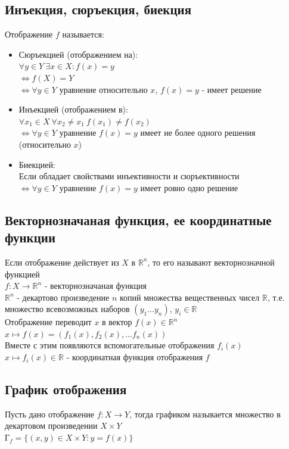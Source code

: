 \newpage
\subsection{Инъекция, сюръекция, биекция}
Отображение $f$ называется:
\begin{itemize}
\item Сюръекцией (отображением на):\\
$\forall y \in Y \ \exists x \in X: f(x) = y$\\
$\Leftrightarrow f(X) = Y$\\
$\Leftrightarrow \forall y \in Y$ уравнение относительно $x$, $f(x) = y$ - имеет решение
\item Инъекцией (отображением в):\\%
$\forall x_1 \in X \ \forall x_2 \neq x_1 \ f(x_1) \neq f(x_2)$\\
$\Leftrightarrow \forall y \in Y$ уравнение $f(x) = y$ имеет не более одного решения (относительно $x$)
\item Биекцией:\\
Если обладает свойствами инъективности и сюръективности\\
$\Leftrightarrow \forall y \in Y$ уравнение $f(x) = y$ имеет ровно одно решение
\end{itemize}
\newpage
\subsection{Векторнозначаная функция, ее координатные функции}
Если отображение действует из $X$ в $\mathbb{R}^n$, то его называют векторнозначной функцией\\
$f: X \rightarrow \mathbb{R}^n$ - векторнозначаная функция\\
\newline
$\mathbb{R}^n$ - декартово произведение $n$ копий множества вещественных чисел $\mathbb{R}$, т.е. множество всевозможных наборов $(y_1 ... y_n)$, $y_i\in \mathbb{R}$\\
\newline
Отображение переводит $x$ в вектор $f(x) \in \mathbb{R}^n$\\
$x \mapsto f(x)=(f_1(x),f_2(x), ... f_n(x))$\\
\newline
Вместе с этим появляются вспомогательные отображения $f_i(x)$\\
$x \mapsto f_i(x)\in \mathbb{R}$ - координатная функция отображения $f$

\newpage
\subsection{График отображения}
Пусть дано отображение $f: X \rightarrow Y$, тогда графиком называется множество в декартовом произведении $X \times Y$\\
Г$_f = \{(x, y) \in X \times Y: y = f(x)\}$

